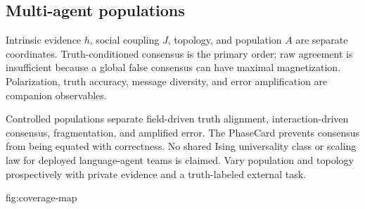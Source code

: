 \subsection{Multi-agent populations}

Intrinsic evidence $h$, social coupling $J$, topology, and population $A$ are
separate coordinates. Truth-conditioned consensus is the primary order; raw
agreement is insufficient because a global false consensus can have maximal
magnetization. Polarization, truth accuracy, message diversity, and error
amplification are companion observables.

 Controlled populations separate field-driven truth
alignment, interaction-driven consensus, fragmentation, and amplified error.
 The PhaseCard prevents consensus from being equated with
correctness.  No shared Ising universality class or
scaling law for deployed language-agent teams is claimed. 
Vary population and topology prospectively with private evidence and a
truth-labeled external task.

{fig:coverage-map}

\FloatBarrier
